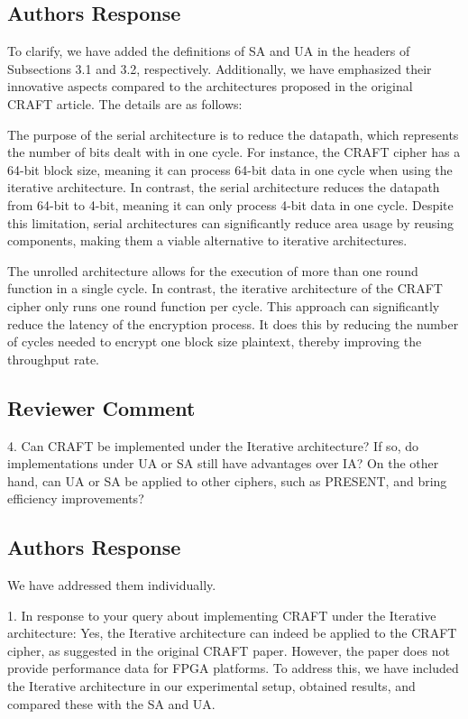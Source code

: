 \subsection{Authors Response}

To clarify, we have added the definitions of SA and UA in the headers of Subsections 3.1 and 3.2, respectively. Additionally, we have emphasized their innovative aspects compared to the architectures proposed in the original CRAFT article. The details are as follows:

\color{blue}
The purpose of the serial architecture is to reduce the datapath, which represents the number of bits dealt with in one cycle. For instance, the CRAFT cipher has a 64-bit block size, meaning it can process 64-bit data in one cycle when using the iterative architecture. In contrast, the serial architecture reduces the datapath from 64-bit to 4-bit, meaning it can only process 4-bit data in one cycle. Despite this limitation, serial architectures can significantly reduce area usage by reusing components, making them a viable alternative to iterative architectures.

The unrolled architecture allows for the execution of more than one round function in a single cycle. In contrast, the iterative architecture of the CRAFT cipher only runs one round function per cycle. This approach can significantly reduce the latency of the encryption process. It does this by reducing the number of cycles needed to encrypt one block size plaintext, thereby improving the throughput rate.
\color{black}



\subsection{Reviewer Comment}
4. Can CRAFT be implemented under the Iterative architecture? If so, do implementations under UA or SA still have advantages over IA? On the other hand, can UA or SA be applied to other ciphers, such as PRESENT, and bring efficiency improvements?

\subsection{Authors Response}

We have addressed them individually. 

1. In response to your query about implementing CRAFT under the Iterative architecture: Yes, the Iterative architecture can indeed be applied to the CRAFT cipher, as suggested in the original CRAFT paper. However, the paper does not provide performance data for FPGA platforms. To address this, we have included the Iterative architecture in our experimental setup, obtained results, and compared these with the SA and UA.

